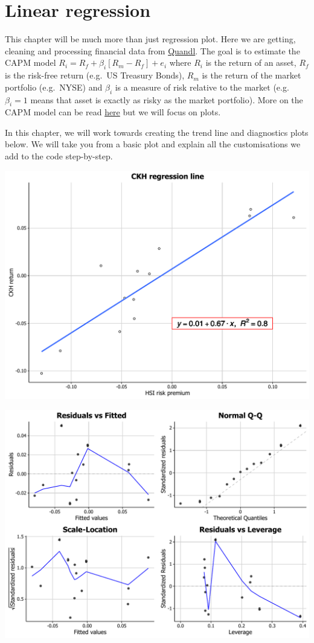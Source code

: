 \chapter{Linear regression}\label{linear-regression}

This chapter will be much more than just regression plot. Here we are
getting, cleaning and processing financial data from
\href{https://www.quandl.com/}{Quandl}. The goal is to estimate the CAPM
model \(R_i = R_f + \beta_i [R_m - R_f] + e_i\) where \(R_i\) is the
return of an asset, \(R_f\) is the risk-free return (e.g.~US Treasury
Bonds), \(R_m\) is the return of the market portfolio (e.g.~NYSE) and
\(\beta_i\) is a measure of risk relative to the market (e.g.
\(\beta_i = 1\) means that asset is exactly as risky as the market
portfolio). More on the CAPM model can be read
\href{http://people.stern.nyu.edu/ashapiro/courses/B01.231103/FFL09.pdf}{here}
but we will focus on plots.

In this chapter, we will work towards creating the trend line and diagnostics plots below. We will take you from a basic plot and explain all the customisations we add to the code step-by-step.

\begin{center}\includegraphics[width=0.55\linewidth]{figures/lr_final-1} \end{center}

\begin{center}\includegraphics[width=0.55\linewidth]{figures/lr_final-2} \end{center}


